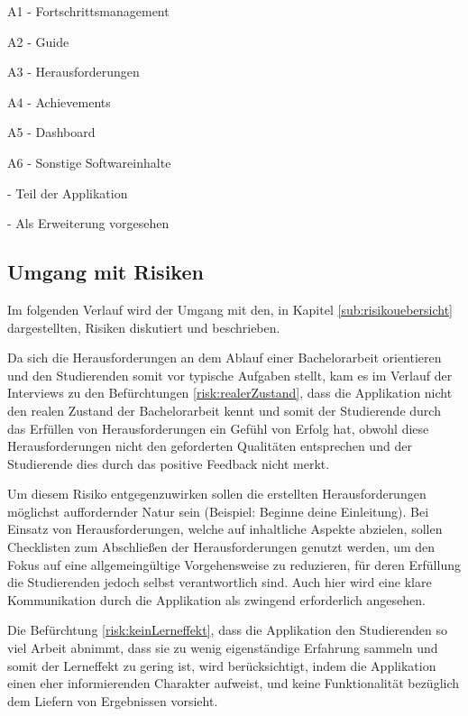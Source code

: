\documentclass[bibliography=totoc,listof=totoc,BCOR=5mm,DIV=12,oneside]{scrbook}
\begin{document}
\begin{tablenotes}
\item  A1 - Fortschrittsmanagement
\item  A2 - Guide
\item  A3 - Herausforderungen
\item  A4 - Achievements
\item  A5 - Dashboard
\item  A6 - Sonstige Softwareinhalte
\item {} - Teil der Applikation
\item {} - Als Erweiterung vorgesehen
\end{tablenotes} 
\label{tab:abdeckungProduktfunktionen}

\newpage
\subsection{Umgang mit Risiken}
\par Im folgenden Verlauf wird der Umgang mit den, in Kapitel \ref{sub:risikouebersicht} dargestellten, Risiken diskutiert und beschrieben.
\par \medskip Da sich die Herausforderungen an dem Ablauf einer Bachelorarbeit orientieren und den Studierenden somit vor typische Aufgaben stellt, kam es im Verlauf der Interviews zu den Befürchtungen \ref{risk:realerZustand}, dass die Applikation nicht den realen Zustand der Bachelorarbeit kennt und somit der Studierende durch das Erfüllen von Herausforderungen ein Gefühl von Erfolg hat, obwohl diese Herausforderungen nicht den geforderten Qualitäten entsprechen und der Studierende dies durch das positive Feedback nicht merkt.
\par Um diesem Risiko entgegenzuwirken sollen die erstellten Herausforderungen möglichst auffordernder Natur sein (Beispiel: Beginne deine Einleitung). Bei Einsatz von Herausforderungen, welche auf inhaltliche Aspekte abzielen, sollen Checklisten zum Abschließen der Herausforderungen genutzt werden, um den Fokus auf eine allgemeingültige Vorgehensweise zu reduzieren, für deren Erfüllung die Studierenden jedoch selbst verantwortlich sind. Auch hier wird eine klare Kommunikation durch die Applikation als zwingend erforderlich angesehen.

\par \medskip Die Befürchtung \ref{risk:keinLerneffekt}, dass die Applikation den Studierenden so viel Arbeit abnimmt, dass sie zu wenig eigenständige Erfahrung sammeln und somit der Lerneffekt zu gering ist, wird berücksichtigt, indem die Applikation einen eher informierenden Charakter aufweist, und keine Funktionalität bezüglich dem Liefern von Ergebnissen vorsieht.
\end{document}
